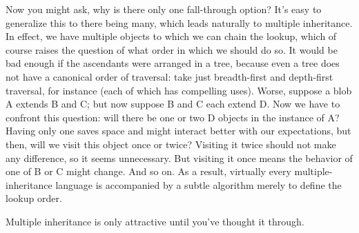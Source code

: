 
Now you might ask, why is there only one fall-through option? It’s easy to
generalize this to there being many, which leads naturally to multiple
inheritance. In effect, we have multiple objects to which we can chain the
lookup, which of course raises the question of what order in which we should do
so. It would be bad enough if the ascendants were arranged in a tree, because
even a tree does not have a canonical order of traversal: take just
breadth-first and depth-first traversal, for instance (each of which has
compelling uses). Worse, suppose a blob A extends B and C; but now suppose B and
C each extend D. Now we have to confront this question: will there be one or two
D objects in the instance of A? Having only one saves space and might interact
better with our expectations, but then, will we visit this object once or twice?
Visiting it twice should not make any difference, so it seems unnecessary. But
visiting it once means the behavior of one of B or C might change. And so on. As
a result, virtually every multiple-inheritance language is accompanied by a
subtle algorithm merely to define the lookup order.

Multiple inheritance is only attractive until you’ve thought it through.
